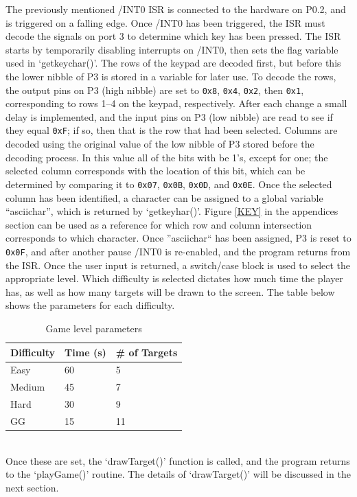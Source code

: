\documentclass[12pt]{article}
\begin{document}
The previously mentioned /INT0 ISR is connected to the hardware on P0.2, and is triggered on a falling edge. Once /INT0 has been triggered, the ISR must decode the signals on port 3 to determine which key has been pressed. The ISR starts by temporarily disabling interrupts on /INT0, then sets the flag variable used in `getkeychar()'. The rows of the keypad are decoded first, but before this the lower nibble of P3 is stored in a variable for later use. To decode the rows, the output pins on P3 (high nibble) are set to \texttt{0x8}, \texttt{0x4}, \texttt{0x2}, then \texttt{0x1}, corresponding to rows 1--4 on the keypad, respectively. After each change a small delay is implemented, and the input pins on P3 (low nibble) are read to see if they equal \texttt{0xF}; if so, then that is the row that had been selected. Columns are decoded using the original value of the low nibble of P3 stored before the decoding process. In this value all of the bits with be 1's, except for one; the selected column corresponds with the location of this bit, which can be determined by comparing it to \texttt{0x07}, \texttt{0x0B}, \texttt{0x0D}, and \texttt{0x0E}. Once the selected column has been identified, a character can be assigned to a global variable ``asciichar'', which is returned by `getkeyhar()'. Figure \ref{KEY} in the appendices section can be used as a reference for which row and column intersection corresponds to which character. Once ''asciichar`` has been assigned, P3 is reset to \texttt{0x0F}, and after another pause /INT0 is re-enabled, and the program returns from the ISR. Once the user input is returned, a switch/case block is used to select the appropriate level. Which difficulty is selected dictates how much time the player has, as well as how many targets will be drawn to the screen. The table below shows the parameters for each difficulty. \\
\begin{table}[h]
	\centering
	\begin{tabular}{|l|l|l|}
		\hline
		Difficulty & Time (s) & \# of Targets \\ \hline
		Easy       & 60       & 5             \\ \hline
		Medium     & 45   	  & 7             \\ \hline
		Hard       & 30   	  & 9             \\ \hline
		GG         & 15   	  & 11            \\ \hline
	\end{tabular}
	\caption{Game level parameters}
	\label{difficulty}
\end{table}\\
Once these are set, the `drawTarget()' function is called, and the program returns to the `playGame()' routine. The details of `drawTarget()' will be discussed in the next section. 
\end{document}
